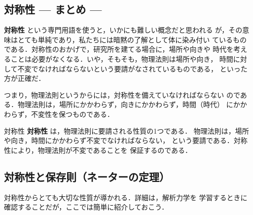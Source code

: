         \subsection{対称性 --- まとめ ---}
            \textbf{対称性} という専門用語を使うと，いかにも難しい概念だと思われる
            が，その意味はとても単純であり，私たちには暗黙の了解として体に染み付い
            ているものである．対称性のおかげで，研究所を建てる場合に，場所や向きや
            時代を考えることは必要がなくなる．いや，そもそも，物理法則は場所や向き，
            時間に対して不変でなければならないという要請がなされているものである，
            といった方が正確だ．

            つまり，物理法則というからには，対称性を備えていなければならない
            のである．物理法則は，場所にかかわらず，向きにかかわらず，時間（時代）
            にかかわらず，不変性を保つものである．
                    \begin{myshadebox}{対称性}
                        \textbf{対称性} は，物理法則に要請される性質の1つである．
                        物理法則は，場所や向き，時間にかかわらず不変でなければならない，
                        という要請である．対称性により，物理法則が不変であることを
                        保証するのである．
                    \end{myshadebox}


        \subsection{対称性と保存則（ネーターの定理）}
            対称性からとても大切な性質が導かれる．詳細は，解析力学を
            学習するときに確認することだが，ここでは簡単に紹介しておこう．

